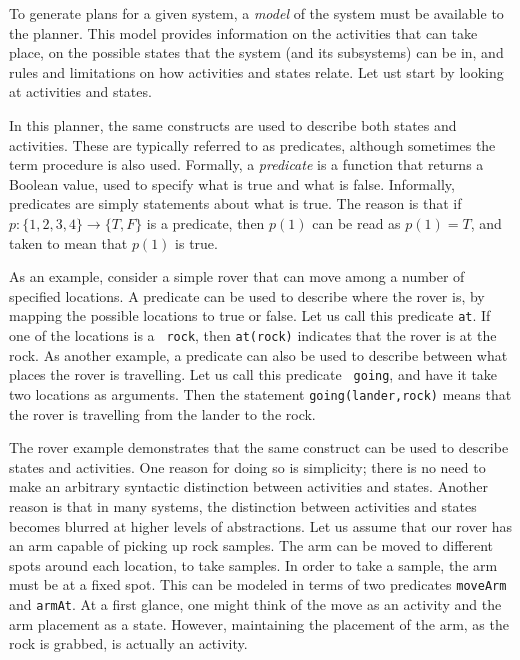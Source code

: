 
To generate plans for a given system, a {\em model} of the system must
be available to the planner.  This model provides information on the
activities that can take place, on the possible states that the system
(and its subsystems) can be in, and rules and limitations on how
activities and states relate.  Let ust start by looking at activities
and states.

In this planner, the same constructs are used to describe both states
and activities.  These are typically referred to as predicates,
although sometimes the term procedure is also used.  Formally, a {\em
predicate} is a function that returns a Boolean value, used to specify
what is true and what is false.  Informally, predicates are simply
statements about what is true.  The reason is that if $p : \{1,2,3,4\}
\rightarrow \{T,F\}$ is a predicate, then $p(1)$ can be read as $p(1)
= T$, and taken to mean that $p(1)$ is true.

As an example, consider a simple rover that can move among a number of
specified locations.  A predicate can be used to describe where the
rover is, by mapping the possible locations to true or false.  Let us
call this predicate {\tt at}.  If one of the locations is a {\tt
rock}, then {\tt at(rock)} indicates that the rover is at the rock.
As another example, a predicate can also be used to describe between
what places the rover is travelling.  Let us call this predicate {\tt
going}, and have it take two locations as arguments.  Then the
statement {\tt going(lander,rock)} means that the rover is travelling
from the lander to the rock.

The rover example demonstrates that the same construct can be used to
describe states and activities.  One reason for doing so is
simplicity; there is no need to make an arbitrary syntactic
distinction between activities and states.  Another reason is that in
many systems, the distinction between activities and states becomes
blurred at higher levels of abstractions.  Let us assume that our
rover has an arm capable of picking up rock samples.  The arm can be
moved to different spots around each location, to take samples.  In
order to take a sample, the arm must be at a fixed spot.  This can be
modeled in terms of two predicates {\tt moveArm} and {\tt armAt}.  At
a first glance, one might think of the move as an activity and the arm
placement as a state.  However, maintaining the placement of the arm,
as the rock is grabbed, is actually an activity.

